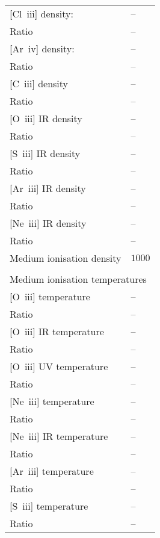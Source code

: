 \begin{longtable}[l]{ll}
 {}[Cl~{\sc iii}] density:           & -- \\
 Ratio                               & -- \\
 {}[Ar~{\sc iv}] density:            & -- \\
 Ratio                               & -- \\
 {}[C~{\sc iii}] density             & -- \\
 Ratio                               & -- \\
 {}[O~{\sc iii}] IR density          & -- \\
 Ratio                               & -- \\
 {}[S~{\sc iii}] IR density          & -- \\
 Ratio                               & -- \\
 {}[Ar~{\sc iii}] IR density         & -- \\
 Ratio                               & -- \\
 {}[Ne~{\sc iii}] IR density         & -- \\
 Ratio                               & -- \\
 Medium ionisation density           & $ 1000$\\
 \vspace{0.2cm}\\\multicolumn{2}{l}{Medium ionisation temperatures}\\ \hline
 {}[O~{\sc iii}] temperature         & -- \\
 Ratio                               & -- \\
 {}[O~{\sc iii}] IR temperature      & -- \\
 Ratio                               & -- \\
 {}[O~{\sc iii}] UV temperature      & -- \\
 Ratio                               & -- \\
 {}[Ne~{\sc iii}] temperature        & -- \\
 Ratio                               & -- \\
 {}[Ne~{\sc iii}] IR temperature     & -- \\
 Ratio                               & -- \\
 {}[Ar~{\sc iii}] temperature        & -- \\
 Ratio                               & -- \\
 {}[S~{\sc iii}] temperature         & -- \\
 Ratio                               & -- \\

\end{longtable}
